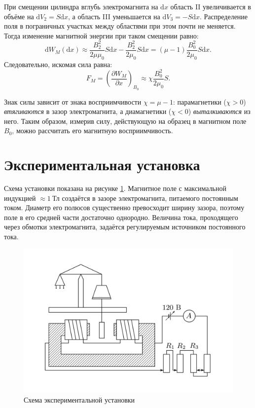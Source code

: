 \documentclass[a4paper, 12pt]{article}
\begin{document}
    При смещении цилиндра вглубь электромагнита на $\text{d}x$ область II увеличивается в объёме на $\text{d}V_2=S\text{d}x$, а область III уменьшается на $\text{d}V_3=-S\text{d}x$. Распределение поля в пограничных участках между областями при этом почти не меняется. Тогда изменение магнитной энергии при таком смещении равно:\[\text{d}W_M(\text{d}x)\approx\frac{B_2^2}{2\mu\mu_0}S\text{d}x-\frac{B_2^2}{2\mu_0}S\text{d}x=\left(\mu-1\right)\frac{B_0^2}{2\mu_0}S\text{d}x.\]Следовательно, искомая сила равна:\[F_M=\left(\frac{\partial W_M}{\partial x}\right)_{B_0}\approx\chi\frac{B_0^2}{2\mu_0}S.\]

    Знак силы зависит от знака восприимчивости $\chi=\mu-1$: парамагнетики ($\chi > 0$) \textit{втягиваются} в зазор электромагнита, а диамагнетики ($\chi < 0$) \textit{выталкиваются} из него. Таким образом, измерив силу, действующую на образец в магнитном поле $B_0$, можно рассчитать его магнитную восприимчивость.

    \section*{Экспериментальная установка}

    Схема установки показана на рисунке \ref{img:device}. Магнитное поле с максимальной индукцией $\approx1~\text{Тл}$ создаётся в зазоре электромагнита, питаемого постоянным током. Диаметр его полюсов существенно превосходит ширину зазора, поэтому поле в его средней части достаточно однородно. Величина тока, проходящего через обмотки электромагнита, задаётся регулируемым источником постоянного тока.

    \begin{figure}[h]
        \centering
        \includegraphics[scale=0.35]{img/device.png}
        \caption{Схема экспериментальной установки} \label{img:device}
    \end{figure}
\end{document}
